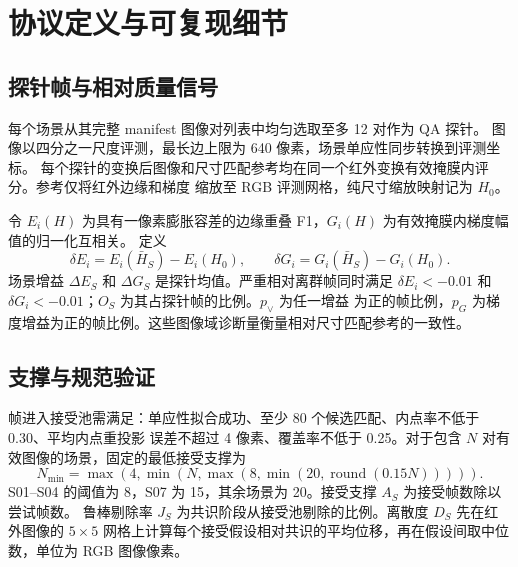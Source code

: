 
\section{协议定义与可复现细节}
\label{sec:protocol_details_zh}

\subsection{探针帧与相对质量信号}

每个场景从其完整 manifest 图像对列表中均匀选取至多 12 对作为 QA 探针。
图像以四分之一尺度评测，最长边上限为 640 像素，场景单应性同步转换到评测坐标。
每个探针的变换后图像和尺寸匹配参考均在同一个红外变换有效掩膜内评分。参考仅将红外边缘和梯度
缩放至 RGB 评测网格，纯尺寸缩放映射记为 $H_0$。

令 $E_i(H)$ 为具有一像素膨胀容差的边缘重叠 F1，$G_i(H)$ 为有效掩膜内梯度幅值的归一化互相关。
定义
\begin{equation}
\delta E_i = E_i(\bar H_S)-E_i(H_0), \qquad
\delta G_i = G_i(\bar H_S)-G_i(H_0).
\end{equation}
场景增益 $\Delta E_S$ 和 $\Delta G_S$ 是探针均值。严重相对离群帧同时满足
$\delta E_i<-0.01$ 和 $\delta G_i<-0.01$；$O_S$ 为其占探针帧的比例。$p_{\lor}$ 为任一增益
为正的帧比例，$p_G$ 为梯度增益为正的帧比例。这些图像域诊断量衡量相对尺寸匹配参考的一致性。

\subsection{支撑与规范验证}
\label{sec:canonical_details_zh}

帧进入接受池需满足：单应性拟合成功、至少 80 个候选匹配、内点率不低于 0.30、平均内点重投影
误差不超过 4 像素、覆盖率不低于 0.25。对于包含 $N$ 对有效图像的场景，固定的最低接受支撑为
\begin{equation}
N_{\min}=\max\!\left(4,\min\!\left(N,\max\!\left(8,
\min\!\left(20,\operatorname{round}(0.15N)\right)\right)\right)\right).
\end{equation}
S01--S04 的阈值为 8，S07 为 15，其余场景为 20。接受支撑 $A_S$ 为接受帧数除以尝试帧数。
鲁棒剔除率 $J_S$ 为共识阶段从接受池剔除的比例。离散度 $D_S$ 先在红外图像的 $5\times5$
网格上计算每个接受假设相对共识的平均位移，再在假设间取中位数，单位为 RGB 图像像素。

